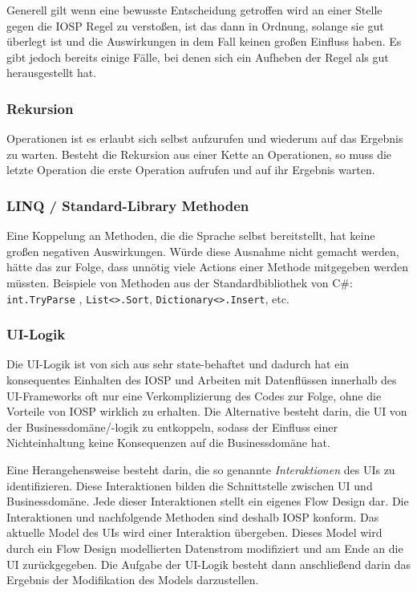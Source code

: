 Generell gilt  wenn eine bewusste Entscheidung getroffen wird an einer Stelle gegen die IOSP
Regel zu verstoßen, ist das dann in Ordnung, solange sie gut überlegt ist und
die Auswirkungen in dem Fall keinen großen Einfluss haben.
Es gibt jedoch bereits einige Fälle, bei denen sich ein Aufheben der Regel als gut
herausgestellt hat.
\subsubsection{Rekursion}

Operationen ist es erlaubt sich selbst aufzurufen und wiederum auf das Ergebnis
zu warten. Besteht die Rekursion aus einer Kette an Operationen, so muss die letzte
Operation die erste Operation aufrufen und auf ihr Ergebnis warten.
\subsubsection{LINQ / Standard-Library Methoden}

Eine Koppelung an Methoden, die die Sprache selbst bereitstellt, hat keine
großen negativen Auswirkungen. Würde diese Ausnahme nicht gemacht werden, hätte
das zur Folge, dass unnötig viele Actions einer Methode mitgegeben werden
müssten. Beispiele von Methoden aus der Standardbibliothek von C\#:
\texttt{int.TryParse} , \texttt{List<>.Sort}, \texttt{Dictionary<>.Insert}, etc.

\subsubsection{UI-Logik}

Die UI-Logik ist von sich aus sehr state-behaftet und dadurch hat ein
konsequentes Einhalten des IOSP und Arbeiten mit Datenflüssen innerhalb des UI-Frameworks oft nur eine
Verkomplizierung des Codes zur Folge, ohne die Vorteile von IOSP wirklich zu
erhalten. Die Alternative besteht darin, die UI von der Businessdomäne/-logik zu
entkoppeln, sodass der Einfluss einer Nichteinhaltung keine Konsequenzen auf
die Businessdomäne hat.

Eine Herangehensweise besteht darin, die so genannte \emph{Interaktionen} des
UIs zu identifizieren. Diese Interaktionen bilden  die Schnittstelle
zwischen UI und Businessdomäne. Jede dieser Interaktionen stellt ein eigenes
Flow Design dar. Die Interaktionen und nachfolgende Methoden sind deshalb IOSP
konform. Das aktuelle Model des UIs wird einer Interaktion übergeben.
Dieses Model wird durch ein Flow Design modellierten Datenstrom modifiziert und am
Ende an die UI zurückgegeben. 
Die Aufgabe der UI-Logik besteht dann anschließend darin das Ergebnis der Modifikation des Models darzustellen.






